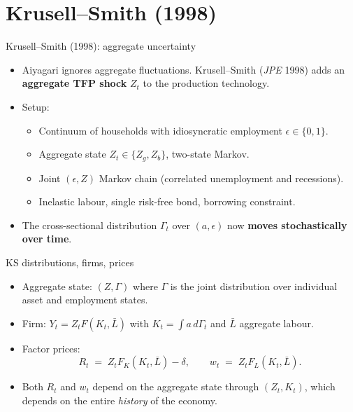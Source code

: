 \documentclass[10pt,english,aspectratio=169]{beamer}
\begin{document}

\section{Krusell--Smith (1998)}

\begin{frame}{Krusell--Smith (1998): aggregate uncertainty}
\begin{itemize}
\item Aiyagari ignores aggregate fluctuations. Krusell--Smith (\emph{JPE} 1998) adds an \textbf{aggregate TFP shock} $Z_t$ to the production technology.
\medskip
\item Setup:
  \begin{itemize}
  \item Continuum of households with idiosyncratic employment $\epsilon \in \{0,1\}$.
  \item Aggregate state $Z_t \in \{Z_g, Z_b\}$, two-state Markov.
  \item Joint $(\epsilon, Z)$ Markov chain (correlated unemployment and recessions).
  \item Inelastic labour, single risk-free bond, borrowing constraint.
  \end{itemize}
\medskip
\item The cross-sectional distribution $\Gamma_t$ over $(a,\epsilon)$ now \textbf{moves stochastically over time}.
\end{itemize}
\end{frame}

\begin{frame}{KS distributions, firms, prices}
\begin{itemize}
\item Aggregate state: $(Z, \Gamma)$ where $\Gamma$ is the joint distribution over individual asset and employment states.
\medskip
\item Firm: $Y_t = Z_t F(K_t, \bar L)$ with $K_t = \int a\,d\Gamma_t$ and $\bar L$ aggregate labour.
\medskip
\item Factor prices:
\[
R_t \;=\; Z_t F_K(K_t, \bar L) - \delta, \qquad
w_t \;=\; Z_t F_L(K_t, \bar L).
\]
\medskip
\item Both $R_t$ and $w_t$ depend on the aggregate state through $(Z_t, K_t)$, which depends on the entire \emph{history} of the economy.
\end{itemize}
\end{frame}
\end{document}
